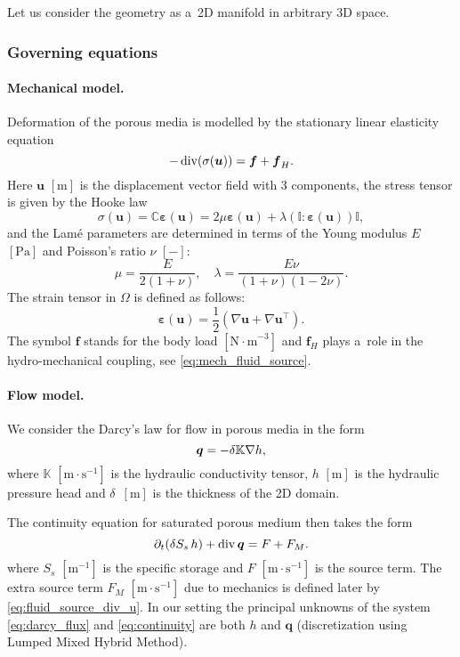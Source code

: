 \documentclass{article}
\def\prtl{\partial}
\def\bunit#1{[\mathrm{#1}]}
\def\grad{\nabla}
\def\div{\operatorname{div}}
\def\vc#1{\mathbf{\boldsymbol{#1}}}     %
\def\tn#1{{\mathbb{#1}}}    %
\def\uu{\vc u}
\def\ee{\vc\varepsilon}
\newcommand{\eq}[1]{\begin{equation}{#1}\end{equation}}
\begin{document}
Let us consider the geometry as a~2D manifold in arbitrary 3D space.

\subsubsection{Governing equations}

\paragraph{Mechanical model.}
Deformation of the porous media is modelled by the stationary linear elasticity equation
\eq{ \label{eq:lin_el} -\div(\tn \sigma(\uu)) = \vc f + \vc f_H. }
Here $\uu$ $\bunit{m}$ is the displacement vector field with 3 components, the stress tensor is given by the Hooke law
\eq{ \tn\sigma(\uu) = \tn C\ee(\uu) = 2\mu\ee(\uu) + \lambda(\tn I:\ee(\uu))\tn I, }
and the Lam\'e parameters are determined in terms of the Young modulus $E$ $\bunit{Pa}$ and Poisson's ratio $\nu$ $\bunit{-}$:
\eq{ \mu = \frac{E}{2(1+\nu)},\quad \lambda = \frac{E\nu}{(1+\nu)(1-2\nu)}. }
The strain tensor in $\Omega$ is defined as follows:
\eq{ \ee(\uu) = \frac12(\nabla\uu+\nabla\uu^\top). }
The symbol $\vc f$ stands for the body load $\bunit{{N\cdot m}^{-3}}$ and $\vc f_H$ plays a~role in the hydro-mechanical coupling,
see \eqref{eq:mech_fluid_source}.


\paragraph{Flow model.}
We consider the Darcy's law for flow in porous media in the form
\eq{ \label{eq:darcy_flux} \vc q = - \delta\tn K \grad h, } %
where $\tn K$ $\bunit{m\cdot s^{-1}}$ is the hydraulic conductivity tensor, $h$ $\bunit{m}$ is the hydraulic pressure head and $\delta$~$\bunit{m}$ is the thickness of the 2D domain.

The continuity equation for saturated porous medium then takes the form
\eq{ \label{eq:continuity}
    \prtl_t (\delta S_s\, h) + \div \vc q = F + F_M. } %
where  $S_s$ $\bunit{m^{-1}}$ is the specific storage and $F$ $\bunit{m\cdot s^{-1}}$ is 
the source term. The extra source term $F_M$ $\bunit{m\cdot s^{-1}}$ due to mechanics is defined later by \eqref{eq:fluid_source_div_u}. In our setting the principal unknowns of the system \eqref{eq:darcy_flux} and \eqref{eq:continuity} are both $h$ and $\vc q$ (discretization using Lumped Mixed Hybrid Method).
\end{document}
